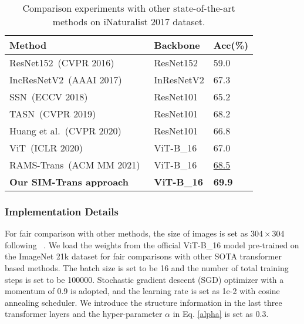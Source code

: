 \documentclass[sigconf, nonacm]{acmart}
\begin{document}
\begin{table}[t]
 \centering
 \caption{Comparison experiments with other state-of-the-art methods on iNaturalist 2017 dataset.}
 \label{table_inat_acc}
 \begin{tabularx}{\linewidth}{|p{4.5cm}|Y|Y|}
  \hline
  
  Method    & Backbone & Acc(\%)  \\ \hline
 
  ResNet152~(CVPR 2016)~\cite{he2016deep}    & ResNet152 &59.0\\
  
  IncResNetV2~(AAAI  2017)~\cite{szegedy2017inception}    & InResNetV2 &67.3\\  
  
  
  
  SSN~(ECCV 2018)~\cite{recasens2018learning}    & ResNet101 &65.2\\
  
  TASN~(CVPR 2019)~\cite{zheng2019looking}    & ResNet101 &68.2\\ 
  
  
  Huang et al.~(CVPR 2020)~\cite{huang2020interpretable}    & ResNet101 &66.8\\


  ViT~(ICLR 2020)~\cite{dosovitskiy2020image}    & ViT-B\_16 &67.0\\ 
  RAMS-Trans~(ACM MM 2021)~\cite{hu2021rams}    & ViT-B\_16 &\underline{68.5}\\
  \textbf{Our SIM-Trans approach}  & \textbf{ViT-B\_16} & \textbf{69.9} \\
  
  \hline
  
 \end{tabularx}
\end{table}




\subsubsection{\textbf{Implementation Details}}

For fair comparison with other methods, the size of images is set as $304 \times 304$ following ~\cite{hu2021rams}. We load the weights from the official ViT-B\_16 model pre-trained on the ImageNet 21k dataset for fair comparisons with other SOTA transformer based methods. The batch size is set to be 16 and the number of total training steps is set to be 100000. Stochastic gradient descent (SGD) optimizer with a momentum of 0.9 is adopted, and the learning rate is set as 1e-2 with cosine annealing scheduler. We introduce the structure information in the last three transformer layers and the hyper-parameter $\alpha $ in Eq. \ref{alpha} is set as 0.3.
\end{document}
